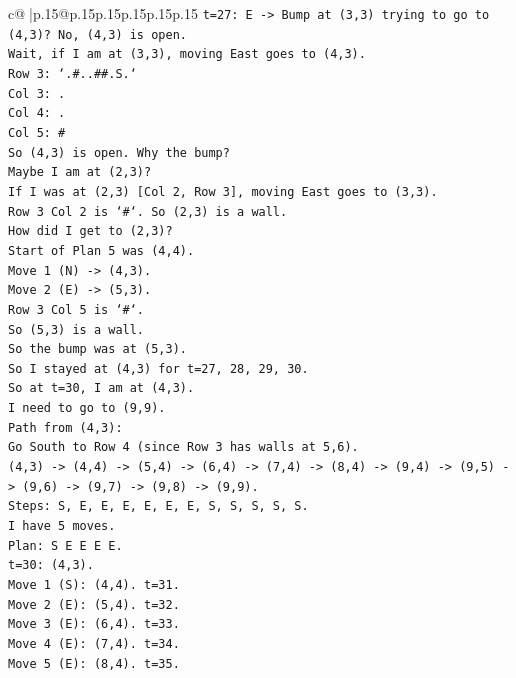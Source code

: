 \documentclass{article}
\begin{document}
{\begin{supertabular}{c@{$\;$}|p{.15\linewidth}@{}p{.15\linewidth}p{.15\linewidth}p{.15\linewidth}p{.15\linewidth}p{.15\linewidth}}
{{{\texttt{t=27: E {-}> Bump at (3,3) trying to go to (4,3)? No, (4,3) is open.} \\
\texttt{Wait, if I am at (3,3), moving East goes to (4,3).} \\
\texttt{Row 3: `.\#..\#\#.S.`} \\
\texttt{Col 3: .} \\
\texttt{Col 4: .} \\
\texttt{Col 5: \#} \\
\texttt{So (4,3) is open. Why the bump?} \\
\texttt{Maybe I am at (2,3)?} \\
\texttt{If I was at (2,3) {[}Col 2, Row 3{]}, moving East goes to (3,3).} \\
\texttt{Row 3 Col 2 is `\#`. So (2,3) is a wall.} \\
\texttt{How did I get to (2,3)?} \\
\texttt{Start of Plan 5 was (4,4).} \\
\texttt{Move 1 (N) {-}> (4,3).} \\
\texttt{Move 2 (E) {-}> (5,3).} \\
\texttt{Row 3 Col 5 is `\#`.} \\
\texttt{So (5,3) is a wall.} \\
\texttt{So the bump was at (5,3).} \\
\texttt{So I stayed at (4,3) for t=27, 28, 29, 30.} \\
\texttt{So at t=30, I am at (4,3).} \\
\texttt{I need to go to (9,9).} \\
\texttt{Path from (4,3):} \\
\texttt{Go South to Row 4 (since Row 3 has walls at 5,6).} \\
\texttt{(4,3) {-}> (4,4) {-}> (5,4) {-}> (6,4) {-}> (7,4) {-}> (8,4) {-}> (9,4) {-}> (9,5) {-}> (9,6) {-}> (9,7) {-}> (9,8) {-}> (9,9).} \\
\texttt{Steps: S, E, E, E, E, E, E, S, S, S, S, S.} \\
\texttt{I have 5 moves.} \\
\texttt{Plan: S E E E E.} \\
\texttt{t=30: (4,3).} \\
\texttt{Move 1 (S): (4,4). t=31.} \\
\texttt{Move 2 (E): (5,4). t=32.} \\
\texttt{Move 3 (E): (6,4). t=33.} \\
\texttt{Move 4 (E): (7,4). t=34.} \\
\texttt{Move 5 (E): (8,4). t=35.} \\
}}}
\end{supertabular}}
\end{document}
